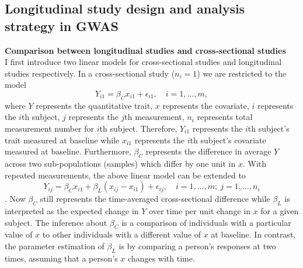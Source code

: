 \documentclass[12pt]{article}
\begin{document}
\subsection{Longitudinal study design and analysis strategy in GWAS}\label{sec:bg:longi}
\textbf{Comparison between longitudinal studies and cross-sectional studies}\\
I first introduce two linear models for cross-sectional studies and longitudinal studies respectively. In a cross-sectional study ($n_i = 1$) we are restricted to the model
\begin{equation}
Y_{i1} = \beta_C x_{i1} + \epsilon_{i1}, \quad i = 1,\ldots,m,
\label{eq:crosssec}
\end{equation}
where $Y$ represents the quantitative trait, $x$ represents the covariate, $i$ represents the $i$th subject, $j$ represents the $j$th measurement, $n_i$ represents total measurement number for $i$th subject. Therefore, $Y_{i1}$ represents the $i$th subject's trait measured at baseline while $x_{i1}$ represents the $i$th subject's covariate measured at baseline. Furthermore, $\beta_C$ represents the difference in average $Y$ across two sub-populations (samples) which differ by one unit in $x$. With repeated measurements, the above linear model can be extended to
\begin{equation}
Y_{ij} = \beta_C x_{i1} + \beta_L ( x_{ij} - x_{i1} ) + \epsilon_{ij}, \quad i = 1, \ldots, m; \ j = 1, \ldots, n_i 
\label{eq:longitudinal}
\end{equation}
\cite{WARE1990}. Now $\beta_C$ still represents the time-averaged cross-sectional difference while $\beta_L$ is interpreted as the expected change in $Y$ over time per unit change in $x$ for a given subject. The inference about $\beta_C$ is a comparison of individuals with a particular value of $x$ to other individuals with a different value of $x$ at baseline. In contrast, the parameter estimation of $\beta_L$ is by comparing a person's responses at two times, assuming that a person's $x$ changes with time.
\end{document}
